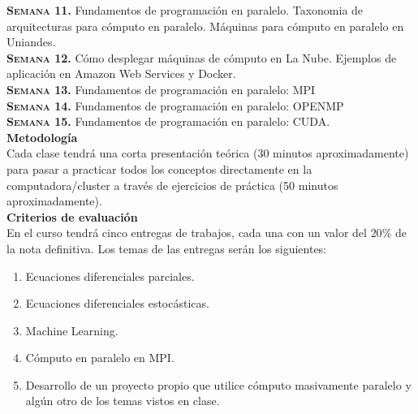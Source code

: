 \documentclass[letterpaper,10pt,onecolumn]{article}
\begin{document}
\noindent\textbf{\textsc{Semana 11.}}  
Fundamentos de programaci\'on en paralelo. Taxonomia de arquitecturas
para c\'omputo en paralelo. M\'aquinas para c\'omputo en paralelo en
Uniandes. 
\\[-0.3cm]  

\noindent\textbf{\textsc{Semana 12.}} 
C\'omo desplegar m\'aquinas de c\'omputo en La Nube. Ejemplos de
aplicaci\'on en Amazon Web Services y Docker. 
\\[-0.3cm]  

\noindent\textbf{\textsc{Semana 13.}} 
Fundamentos de programaci\'on en paralelo: MPI
\\[-0.3cm] 

\noindent\textbf{\textsc{Semana 14.}} 
Fundamentos de programaci\'on en paralelo: OPENMP
\\[-0.3cm] 

\noindent\textbf{\textsc{Semana 15.}} 
Fundamentos de programaci\'on en
paralelo: CUDA.
\\[-0.1cm]  


\noindent\textbf{\large {} \quad
  Metodolog\'ia}\\[-0.2cm] 


\noindent\normalsize Cada clase tendr\'a una corta presentaci\'on
te\'orica (30 minutos aproximadamente) para pasar a practicar todos
los conceptos directamente en la computadora/cluster a trav\'es de
ejercicios de pr\'actica (50 minutos aproximadamente). \\[0.1cm]


\noindent\textbf{\large {} \quad Criterios de
  evaluaci\'on}\\[-0.2cm] 


En el curso tendr\'a cinco entregas de trabajos, cada una con un valor
del $20\%$ de la nota definitiva. Los temas de las entregas ser\'an
los siguientes:
\begin{enumerate}
\item Ecuaciones diferenciales parciales.
\\[-0.6cm]
\item Ecuaciones diferenciales estoc\'asticas.
\\[-0.6cm]
\item Machine Learning.
\\[-0.6cm]
\item C\'omputo en paralelo en MPI.
\\[-0.6cm]
\item Desarrollo de un proyecto propio que utilice c\'omputo
  masivamente paralelo y alg\'un otro de los temas vistos en clase. 
\\[-0.2cm]
\end{enumerate}
\end{document}
